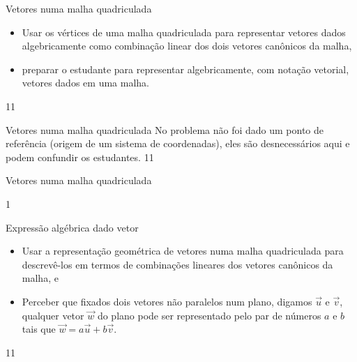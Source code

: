 \cleardoublepage

\def\currentcolor{session1}
\begin{objectives}{Vetores numa malha quadriculada}
{
 \begin{itemize}
\item {} 
Usar os vértices de uma malha quadriculada para representar vetores dados algebricamente como combinação linear dos dois vetores canônicos da malha,

\item {} 
preparar o estudante para representar algebricamente, com notação vetorial, vetores dados em uma malha.

\end{itemize}
}{1}{1}
\end{objectives}
\begin{sugestions}{Vetores numa malha quadriculada}
{
No problema não foi dado um ponto de referência (origem de um sistema de coordenadas), eles são desnecessários aqui e podem confundir os estudantes.
}{1}{1}
\end{sugestions}
\begin{answer}{Vetores numa malha quadriculada}
{
\begin{center}\end{center}
}{1}
\end{answer}
\begin{objectives}{Expressão algébrica dado vetor}
{
\begin{itemize}
\item Usar a representação geométrica de vetores numa malha quadriculada para descrevê-los em termos de combinações lineares dos vetores canônicos da malha, e
\item Perceber que fixados dois vetores não paralelos num plano, digamos \(\vec{u}\) e \(\vec{v}\), qualquer vetor \(\vec{w}\) do plano pode ser representado pelo par de números \(a\) e \(b\) tais que \(\vec{w}=a\vec{u}+b\vec{v}\).
\end{itemize}
}{1}{1}
\end{objectives}
